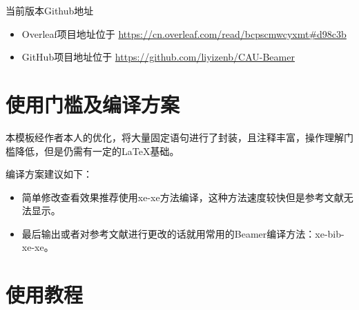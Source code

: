 \documentclass{CAUBeamer}
\begin{document}
\begin{frame}{当前版本Github地址}
    \begin{itemize}
        \item  Overleaf项目地址位于 \url{https://cn.overleaf.com/read/bcpscmwcyxmt\#d98c3b}
        \item GitHub项目地址位于 \url{https://github.com/liyizenb/CAU-Beamer}
    \end{itemize}
\end{frame}

\section{使用门槛及编译方案}

\begin{frame}
    \qquad 本模板经作者本人的优化，将大量固定语句进行了封装，且注释丰富，操作理解门槛降低，但是仍需有一定的\LaTeX{}基础。
    \par 编译方案建议如下：
    \begin{itemize}
        \item 简单修改查看效果推荐使用xe-xe方法编译，这种方法速度较快但是参考文献无法显示。
        \item 最后输出或者对参考文献进行更改的话就用常用的Beamer编译方法：xe-bib-xe-xe。
    \end{itemize}
\end{frame}

\section{使用教程}
\end{document}
